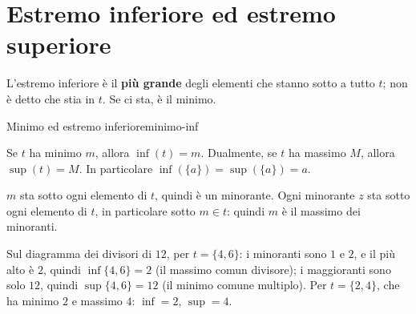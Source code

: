 \section{Estremo inferiore ed estremo superiore}\label{sec:inf-sup}


L'estremo inferiore è il \textbf{più grande} degli elementi che stanno sotto a tutto $t$; non è detto che stia in $t$. Se ci sta, è il minimo.

\begin{concetto}
\begin{Proposizione}{Minimo ed estremo inferiore}{minimo-inf}
    \begin{prerequisiti}
    \end{prerequisiti}
    Se $t$ ha minimo $m$, allora $\inf(t) = m$. Dualmente, se $t$ ha massimo $M$, allora $\sup(t) = M$. In particolare $\inf(\{a\}) = \sup(\{a\}) = a$.
\end{Proposizione}
\begin{dimostrazione}
    $m$ sta sotto ogni elemento di $t$, quindi è un minorante. Ogni minorante $z$ sta sotto ogni elemento di $t$, in particolare sotto
    $m \in t$: quindi $m$ è il massimo dei minoranti.
\end{dimostrazione}
\end{concetto}

\begin{spiegazione}
    Sul diagramma dei divisori di $12$, per $t = \{4, 6\}$: i minoranti sono $1$ e $2$, e il più alto è $2$, quindi $\inf\{4, 6\} = 2$ (il massimo
    comun divisore); i maggioranti sono solo $12$, quindi $\sup\{4, 6\} = 12$ (il minimo comune multiplo). Per $t = \{2, 4\}$, che ha minimo $2$
    e massimo $4$: $\inf = 2$, $\sup = 4$.
    \begin{center}
    \end{center}
\end{spiegazione}

